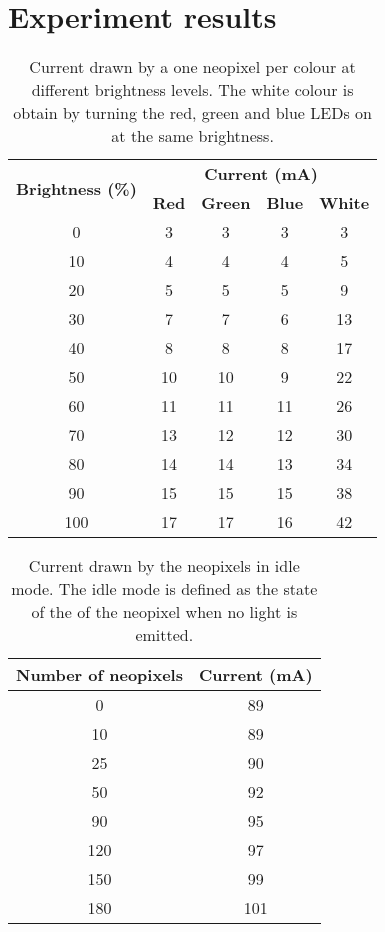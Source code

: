\chapter{Experiment results}\label{appendix_result}

\begin{table}[h!]
	\centering
	\caption{Current drawn by a one neopixel per colour at different brightness levels. The white colour is obtain by turning the red, green and blue LEDs on at the same brightness.}
	\label{table:current_one_pixel}
	\begin{tabular}{ccccc}
		\hline
		\hline
		\toprule
		\multirow{2}{*}{\textbf{Brightness (\%)}} & \multicolumn{4}{c}{\textbf{Current (mA)}}\\
		& \textbf{Red} & \textbf{Green} & \textbf{Blue} & \textbf{White} \\
		\hline
		\toprule
		\toprule
		0    &    3    &    3    &    3    &    3    \\
		10    &    4    &    4    &    4    &    5    \\
		20    &    5    &    5    &    5    &    9    \\
		30    &    7    &    7    &    6    &    13    \\
		40    &    8    &    8    &    8    &    17    \\
		50    &    10    &    10    &    9    &    22    \\
		60    &    11    &    11    &    11    &    26    \\
		70    &    13    &    12    &    12    &    30    \\
		80    &    14    &    14    &    13    &    34    \\
		90    &    15    &    15    &    15    &    38    \\
		100    &    17    &    17    &    16    &    42    \\
		\bottomrule
		\hline
		\hline
	\end{tabular}
\end{table}
\begin{table}[h!]
	\centering
	\caption{Current drawn by the neopixels in idle mode. The idle mode is defined as the state of the of the neopixel when no light is emitted.}
	\label{table:current_idle}
	\begin{tabular}{cc}
		\hline
		\hline
		\toprule
		\textbf{Number of neopixels} & \textbf{Current (mA)}\\
		\bottomrule
		\toprule
		0    &    89    \\
		10    &    89    \\
		25    &    90    \\
		50    &    92    \\
		90    &    95    \\
		120    &    97    \\
		150    &    99    \\
		180    &    101    \\
		\bottomrule
		\hline
		\hline
	\end{tabular}
\end{table}		

